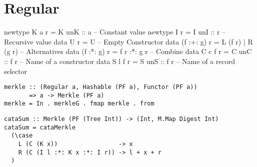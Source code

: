 \section{Regular}

\begin{haskell}
newtype K a r    = K { unK :: a}     -- Constant value
newtype I r      = I { unI :: r }    -- Recursive value
data U r         = U                 -- Empty Constructor
data (f :+: g) r = L (f r) | R (g r) -- Alternatives
data (f :*: g) r = f r :*: g r       -- Combine
data C c f r     = C { unC :: f r }  -- Name of a constructor
data S l f r     = S { unS :: f r }  -- Name of a record selector
\end{haskell}

\begin{verbatim}
merkle :: (Regular a, Hashable (PF a), Functor (PF a))
       => a -> Merkle (PF a)
merkle = In . merkleG . fmap merkle . from
\end{verbatim}

\begin{verbatim}
cataSum :: Merkle (PF (Tree Int)) -> (Int, M.Map Digest Int)
cataSum = cataMerkle
  (\case
    L (C (K x))                 -> x
    R (C (I l :*: K x :*: I r)) -> l + x + r
  )
\end{verbatim}
